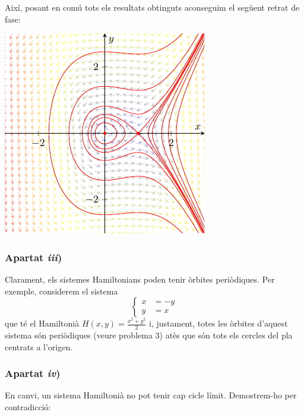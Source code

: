 \documentclass[10pt,a4paper]{article}
\begin{document}
Així, posant en comú tots els resultats obtinguts aconseguim el següent retrat de fase:
\begin{center}
  \begin{minipage}[h]{\textwidth}
    \centering
    \includegraphics[scale=2]{Images/retrat2htot}
    \label{retrat2tot}
  \end{minipage}
\end{center}
\subsubsection*{Apartat \emph{iii})}
Clarament, els sistemes Hamiltonians poden tenir òrbites periòdiques. Per exemple, considerem el sistema
$$
  \left\lbrace
  \begin{aligned}
    x & =-y \\
    y & =x
  \end{aligned}
  \right.
$$
que té el Hamiltonià $\displaystyle H(x,y)=\frac{x^2+y^2}{2}$ i, justament, totes les òrbites d'aquest sistema són periòdiques (veure problema 3) atès que són tots els cercles del pla centrats a l'origen.
\subsubsection*{Apartat \emph{iv})}
En canvi, un sistema Hamiltonià no pot tenir cap cicle límit. Demostrem-ho per contradicció:
\end{document}
